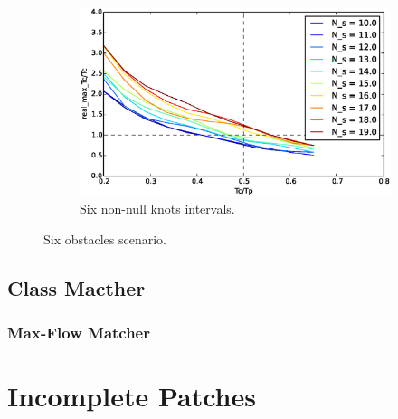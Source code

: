 \begin{figure}
        ~ %
        \begin{subfigure}[b]{0.48\textwidth}
                \includegraphics[width=\textwidth]{./img/realtime/Scenario_6__N_knots_6/uni.eps}
                \caption{Six non-null knots intervals.}\label{fig:uni66}
        \end{subfigure}
        \caption{Six obstacles scenario.}\label{fig:uni6}
\end{figure}

\newpage

\section{Class Macther}
\lipsum[1-2]
\subsection{Max-Flow Matcher}
\lipsum[1-3]

\chapter{Incomplete Patches}
\lipsum[1-10]